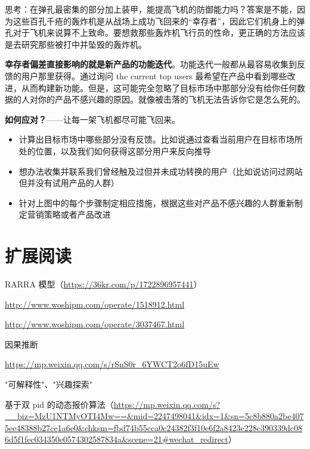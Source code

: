 \documentclass[12pt]{article}
\begin{document}
思考：在弹孔最密集的部分加上装甲，能提高飞机的防御能力吗？答案是不能，因为这些百孔千疮的轰炸机是从战场上成功飞回来的“幸存者”，因此它们机身上的弹孔对于飞机来说算不上致命。要想救那些轰炸机飞行员的性命，更正确的方法应该是去研究那些被打中并坠毁的轰炸机。

\textbf{幸存者偏差直接影响的就是新产品的功能迭代}。功能迭代一般都从最容易收集到反馈的用户那里获得。通过询问 the current top users 最希望在产品中看到哪些改进，从而构建新功能。但是，这可能完全忽略了目标市场中那部分没有给你任何数据的人对你的产品不感兴趣的原因。就像被击落的飞机无法告诉你它是怎么死的。

\textbf{如何应对？}——让每一架飞机都尽可能飞回来。
\begin{itemize}
\setlength{\itemsep}{0pt}
\setlength{\parsep}{0pt}
\setlength{\parskip}{0pt}
    \item 计算出目标市场中哪些部分没有反馈。比如说通过查看当前用户在目标市场所处的位置，以及我们如何获得这部分用户来反向推导

    \item 想办法收集并联系我们曾经触及过但并未成功转换的用户（比如说访问过网站但并没有试用产品的人群）

    \item 针对上图中的每个步骤制定相应措施，根据这些对产品不感兴趣的人群重新制定营销策略或者产品改进
\end{itemize}




\section{扩展阅读}
RARRA 模型（\url{https://36kr.com/p/1722896957441}）

\url{http://www.woshipm.com/operate/1518912.html}

\url{http://www.woshipm.com/operate/3037467.html}

因果推断

\url{https://mp.weixin.qq.com/s/rSnS0r_6YWCT2o6fD15uEw}

"可解释性"、"兴趣探索"

基于双 pid 的动态报价算法（\url{https://mp.weixin.qq.com/s?__biz=MzU1NTMyOTI4Mw==&mid=2247498041&idx=1&sn=5c8b880a2be4075ee48388b27ce1a6e0&chksm=fbd74b55cca0c24382f3f10e6f2a8423e228c390339dc086d5f1fec034350e0574302587834a&scene=21#wechat_redirect}）



\end{document}
